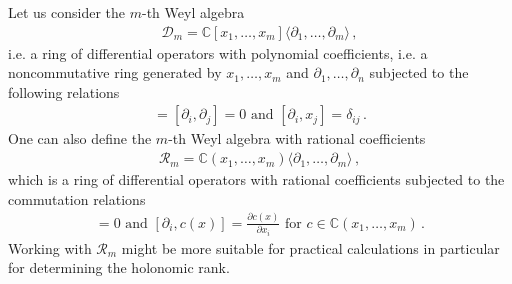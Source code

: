 \documentclass[11pt]{article}
\begin{document}
Let us consider the $m$-th Weyl algebra 
\begin{align}
\mathcal{D}_{m} = \mathbb{C} [x_{1}, \ldots , x_{m}] \langle \partial_{1}, \ldots , \partial_{m}  \rangle \,,     
\end{align}
i.e. a ring of differential operators with polynomial coefficients, i.e. a noncommutative ring generated by $x_{1}, \hdots , x_{m}$ and $\partial_{1}, \hdots, \partial_{n}$ subjected to the following relations
\begin{align}
[x_{i}, x_{j}] = [\partial_{i}, \partial_{j}] = 0  \text{ and } [\partial_{i}, x_{j}] = \delta_{ij} \,. 
\label{eq:poly_weyl_commutation}
\end{align}
One can also define the $m$-th Weyl algebra with rational coefficients
\begin{align}
\mathcal{R}_{m} = \mathbb{C} (x_{1}, \ldots , x_{m}) \langle \partial_{1}, \ldots , \partial_{m}  \rangle \,,     
\end{align}    
which is a ring of differential operators with rational coefficients subjected to the commutation relations
\begin{align}
[\partial_{i}, \partial_{j}] = 0  \text{ and } [\partial_{i}, c(x)] = \frac{\partial c(x)}{\partial x_{i}} \text{ for } c \in \mathbb{C} (x_{1}, \ldots , x_{m}) \,. 
\label{eq:rat_weyl_commutation}
\end{align}
Working with $\mathcal{R}_{m}$ might be more suitable for practical calculations in particular for determining the holonomic rank. 
\end{document}
